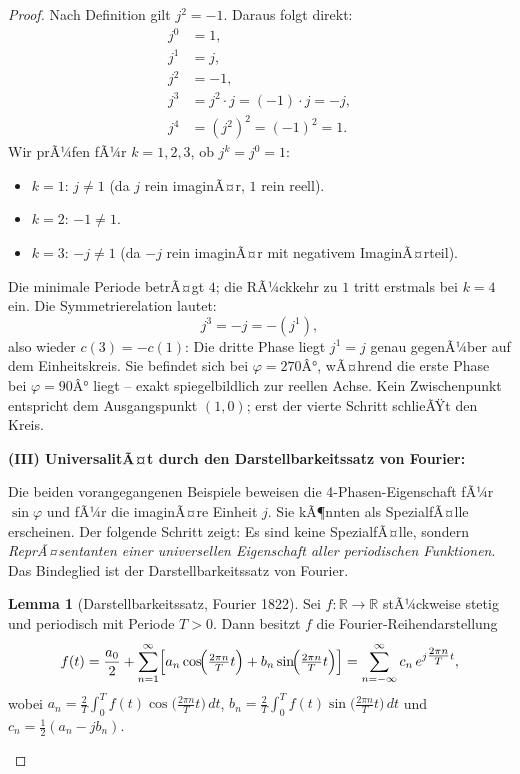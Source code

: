 ﻿\documentclass[a4paper,12pt]{article}
\theoremstyle{definition}
\newtheorem{lemma}[theorem]{Lemma}
\begin{document}
\begin{proof}
Nach Definition gilt $j^2 = -1$. Daraus folgt direkt:
\begin{align*}
	j^0 &= 1, \\
	j^1 &= j, \\
	j^2 &= -1, \\
	j^3 &= j^2 \cdot j = (-1)\cdot j = -j, \\
	j^4 &= (j^2)^2 = (-1)^2 = 1.
\end{align*}
Wir prÃ¼fen fÃ¼r $k = 1, 2, 3$, ob $j^k = j^0 = 1$:
\begin{itemize}
	\item $k=1$: $j \neq 1$ (da $j$ rein imaginÃ¤r, $1$ rein reell).
	\item $k=2$: $-1 \neq 1$.
	\item $k=3$: $-j \neq 1$ (da $-j$ rein imaginÃ¤r mit negativem ImaginÃ¤rteil).
\end{itemize}
Die minimale Periode betrÃ¤gt $4$; die RÃ¼ckkehr zu $1$ tritt erstmals bei $k=4$ ein.
Die Symmetrierelation lautet:
\[
	j^3 = -j = -(j^1),
\]
also wieder $c(3) = -c(1)$: Die dritte Phase liegt $j^1 = j$ genau gegenÃ¼ber
auf dem Einheitskreis. Sie befindet sich bei $\varphi = 270Â°$, wÃ¤hrend die erste
Phase bei $\varphi = 90Â°$ liegt -- exakt spiegelbildlich zur reellen Achse.
Kein Zwischenpunkt entspricht dem Ausgangspunkt $(1,0)$; erst der vierte Schritt
schlieÃŸt den Kreis.

\medskip
\textbf{(III) UniversalitÃ¤t durch den Darstellbarkeitssatz von Fourier:}

Die beiden vorangegangenen Beispiele beweisen die 4-Phasen-Eigenschaft fÃ¼r
$\sin\varphi$ und fÃ¼r die imaginÃ¤re Einheit $j$. Sie kÃ¶nnten als SpezialfÃ¤lle
erscheinen. Der folgende Schritt zeigt: Es sind keine SpezialfÃ¤lle, sondern
\textit{ReprÃ¤sentanten einer universellen Eigenschaft aller periodischen Funktionen}.
Das Bindeglied ist der Darstellbarkeitssatz von Fourier.

\begin{lemma}[Darstellbarkeitssatz, Fourier 1822]
	Sei $f\colon\mathbb{R}\to\mathbb{R}$ stÃ¼ckweise stetig und periodisch mit
	Periode $T > 0$. Dann besitzt $f$ die Fourier-Reihendarstellung
	\begin{equation}
		f(t)
		= \frac{a_0}{2}
		+ \sum_{n=1}^{\infty}
		\Bigl[
		a_n\cos\!\Bigl(\tfrac{2\pi n}{T}t\Bigr)
		+ b_n\sin\!\Bigl(\tfrac{2\pi n}{T}t\Bigr)
		\Bigr]
		= \sum_{n=-\infty}^{\infty} c_n\,e^{j\tfrac{2\pi n}{T}t},
	\end{equation}
	wobei $a_n = \tfrac{2}{T}\!\int_0^T f(t)\cos\!\bigl(\tfrac{2\pi n}{T}t\bigr)\,dt$,
	$b_n = \tfrac{2}{T}\!\int_0^T f(t)\sin\!\bigl(\tfrac{2\pi n}{T}t\bigr)\,dt$
	und $c_n = \tfrac{1}{2}(a_n - jb_n)$.
\end{lemma}


\end{proof}
\end{document}

